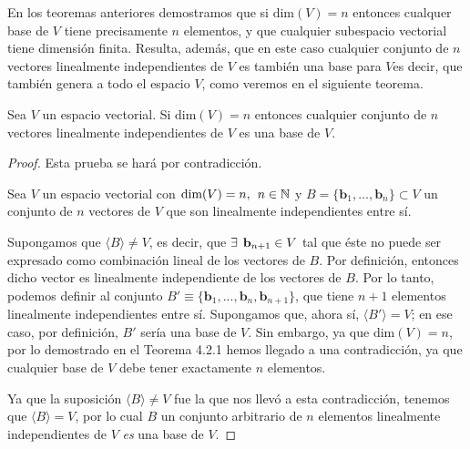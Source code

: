 \documentclass[12pt]{article}
\newenvironment{teorema}[2][Teorema]{\begin{trivlist}
\item[\hskip \labelsep {\bfseries #1}\hskip \labelsep {\bfseries #2.}]}{\end{trivlist}}
\begin{document}
En los teoremas anteriores demostramos que si $\text{dim}(V)=n$ entonces cualquer base de $V$ tiene precisamente $n$ elementos, y que cualquier subespacio vectorial tiene dimensión finita. Resulta, además, que en este caso cualquier conjunto de $n$ vectores linealmente independientes de $V$ es también una base para $V$\textemdash es decir, que también genera a todo el espacio $V$, como veremos en el siguiente teorema. 

\begin{teorema} {4.2.3}

    Sea $V$ un espacio vectorial. Si $\text{dim}(V)=n$ entonces cualquier conjunto de $n$ vectores linealmente independientes de $V$ es una base de $V$.

\begin{proof}

    Esta prueba se hará por contradicción. 

    Sea $V$ un espacio vectorial con $\text{dim}(V)=n, \hspace{1.5mm} n\in\mathbb{N}$ y $B=\{\mathbf{b}_1, ..., \mathbf{b}_n\}\subset V$ un conjunto de $n$ vectores de $V$ que son linealmente independientes entre sí.

    Supongamos que $\langle B \rangle \neq V$, es decir, que $\exists\hspace{1.5mm} \mathbf{b}_{n+1}\in V$ tal que éste no puede ser expresado como combinación lineal de los vectores de $B$. Por definición, entonces dicho vector es linealmente independiente de los vectores de $B$. Por lo tanto, podemos definir al conjunto $B'\equiv\{\mathbf{b}_1, ...,\mathbf{b}_n, \mathbf{b}_{n+1}\}$, que tiene $n+1$ elementos linealmente independientes entre sí. Supongamos que, ahora sí, $\langle B' \rangle = V$; en ese caso, por definición, $B'$ sería una base de $V$. Sin embargo, ya que $\text{dim}(V)=n$, por lo demostrado en el Teorema 4.2.1 hemos llegado a una contradicción, ya que cualquier base de $V$ debe tener exactamente $n$ elementos.
    
    Ya que la suposición $\langle B \rangle \neq V$ fue la que nos llevó a esta contradicción, tenemos que $\langle B \rangle = V$, por lo cual $B$ \textemdash un conjunto arbitrario de $n$ elementos linealmente independientes de $V$\textemdash \hspace{1mm} \emph{es} una base de $V$.

\end{proof}

\end{teorema}
\end{document}
